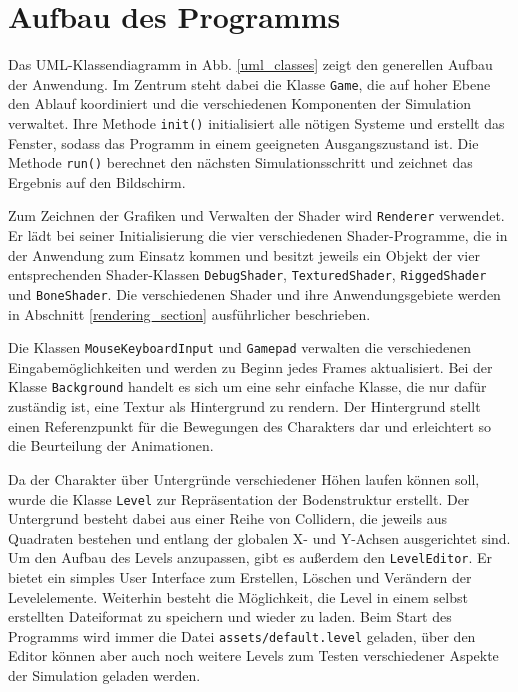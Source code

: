 \section{Aufbau des Programms} \label{aufbau}
Das UML-Klassendiagramm in Abb. \ref{uml_classes} zeigt den generellen Aufbau der Anwendung. Im Zentrum steht dabei die Klasse \lstinline{Game}, die auf hoher Ebene den Ablauf koordiniert und die verschiedenen Komponenten der Simulation verwaltet. Ihre Methode \lstinline{init()} initialisiert alle nötigen Systeme und erstellt das Fenster, sodass das Programm in einem geeigneten Ausgangszustand ist. Die Methode \lstinline{run()} berechnet den nächsten Simulationsschritt und zeichnet das Ergebnis auf den Bildschirm.

Zum Zeichnen der Grafiken und Verwalten der Shader wird \lstinline{Renderer} verwendet. Er lädt bei seiner Initialisierung die vier verschiedenen Shader-Programme, die in der Anwendung zum Einsatz kommen und besitzt jeweils ein Objekt der vier entsprechenden Shader-Klassen \lstinline{DebugShader}, \lstinline{TexturedShader}, \lstinline{RiggedShader} und \lstinline{BoneShader}. Die verschiedenen Shader und ihre Anwendungsgebiete werden in Abschnitt \ref{rendering_section} ausführlicher beschrieben.

Die Klassen \lstinline {MouseKeyboardInput} und \lstinline{Gamepad} verwalten die verschiedenen Eingabemöglichkeiten und werden zu Beginn jedes Frames aktualisiert. Bei der Klasse \lstinline{Background} handelt es sich um eine sehr einfache Klasse, die nur dafür zuständig ist, eine Textur als Hintergrund zu rendern. Der Hintergrund stellt einen Referenzpunkt für die Bewegungen des Charakters dar und erleichtert so die Beurteilung der Animationen.

Da der Charakter über Untergründe verschiedener Höhen laufen können soll, wurde die Klasse \lstinline{Level} zur Repräsentation der Bodenstruktur erstellt. Der Untergrund besteht dabei aus einer Reihe von Collidern, die jeweils aus Quadraten bestehen und entlang der globalen X- und Y-Achsen ausgerichtet sind. Um den Aufbau des Levels anzupassen, gibt es außerdem den \lstinline{LevelEditor}. Er bietet ein simples User Interface zum Erstellen, Löschen und Verändern der Levelelemente. Weiterhin besteht die Möglichkeit, die Level in einem selbst erstellten Dateiformat zu speichern und wieder zu laden. Beim Start des Programms wird immer die Datei \lstinline{assets/default.level} geladen, über den Editor können aber auch noch weitere Levels zum Testen verschiedener Aspekte der Simulation geladen werden.

